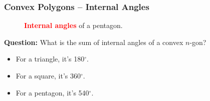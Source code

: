 \documentclass[aspectratio=169,11pt,svgnames,handout]{beamer}
\begin{document}
\begin{frame}
 \frametitle{Convex Polygons -- Internal Angles}
 \begin{figure}[H]
  \caption*{\textcolor{Red}{\textbf{Internal angles}} of a pentagon.}
 \end{figure}
 \textbf{Question:} What is the sum of internal angles of a convex $n$-gon?
 \begin{itemize}[label=\textbullet]
  \item<2-> For a triangle, it's 180$^{ \circ }$.
  \item<3-> For a square, it's 360$^{\circ}$.
  \item<4-> For a pentagon, it's 540$^{ \circ }$.
 \end{itemize}
\end{frame}
\end{document}
